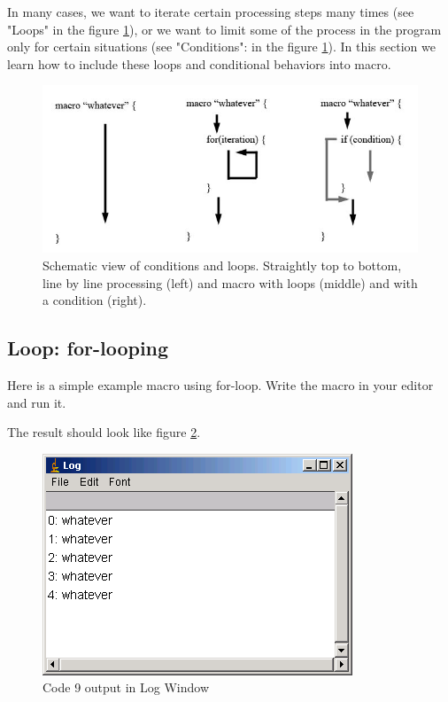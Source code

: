 In many cases, we want to iterate certain processing steps many times (see "Loops" in the figure \ref{fig_scriptscheme}), or we want to limit some of the process in the program only for certain situations (see "Conditions": in the figure \ref{fig_scriptscheme}). In this section we learn how to include these loops and conditional behaviors into macro. 

\begin{figure}[htbp]
\begin{center}
\includegraphics[width=\textwidth]{fig/fig23_1_ScriptSchemes.png}
\caption{Schematic view of conditions and loops. Straightly top to bottom, line by line processing (left) and macro with loops (middle) and with a condition (right).} \label{fig_scriptscheme}
\end{center}
\end{figure}

\subsection{Loop: for-looping}
Here is a simple example macro using for-loop. Write the macro in your editor and run it. 

%
The result should look like figure \ref{fig_whateverOut}.

\begin{figure}[!ht]
\begin{center}
\includegraphics[scale=0.6]{fig/fig2311_whatever5.png}
\caption{Code 9 output in Log Window}
\label{fig_whateverOut}
\end{center}
\end{figure}

